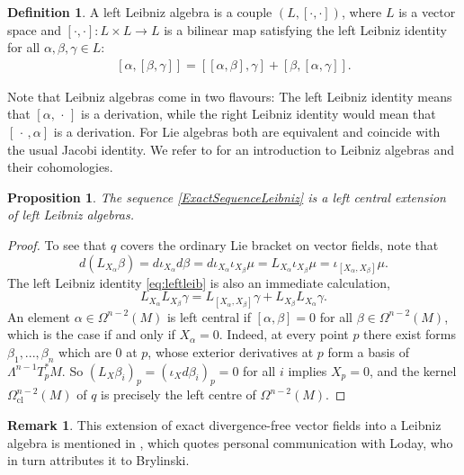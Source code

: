 \documentclass{article}
\newcommand{\cl}{\mathrm{cl}}
\newtheorem{Proposition}[Theorem]{Proposition}
\theoremstyle{definition}
\newtheorem{Definition}[Theorem]{Definition}
\newtheorem{Remark}[Theorem]{Remark}
\begin{document}
\begin{Definition}
    A left Leibniz algebra is a couple $(L,[\cdot,\cdot])$, where $L$ is a vector space and $[\cdot,\cdot]:L\times L\to L$ is a bilinear map satisfying the left Leibniz identity for all $\alpha,\beta,\gamma\in L$:
    \begin{align}\label{eq:leftleib}
        [\alpha, [\beta,\gamma]] = [[\alpha,\beta],\gamma] + 
[\beta, [\alpha,\gamma]].
    \end{align}
\end{Definition} 

Note that Leibniz algebras come in two flavours: The left Leibniz identity means that $[\alpha,\,\cdot\,]$ is a derivation, while the right Leibniz identity would mean that $[\,\cdot\,,\alpha]$ is a derivation. For Lie algebras both are equivalent and coincide with the usual Jacobi identity. We refer to \cite{FeldvossWagemann21} for an introduction to Leibniz algebras and their cohomologies.


\begin{Proposition}
The sequence \eqref{ExactSequenceLeibniz}
is a left central extension of left Leibniz algebras.
\end{Proposition}
\begin{proof}
To see that $q$ covers the ordinary Lie bracket on vector fields, note that \[d(L_{X_\alpha}\beta) = d\iota_{X_{\alpha}}d\beta = d\iota_{X_{\alpha}}\iota_{X_{\beta}}\mu = L_{X_{\alpha}}\iota_{X_{\beta}}\mu = \iota_{[X_{\alpha},X_{\beta}]}\mu.\]
The left Leibniz identity \eqref{eq:leftleib} is also an immediate calculation,
\[
L_{X_{\alpha}}L_{X_{\beta}}\gamma = L_{[X_{\alpha},X_{\beta}]}\gamma + L_{X_{\beta}}L_{X_{\alpha}}\gamma.
\]
An element $\alpha \in \Omega^{n-2}(M)$
is left central if $[\alpha, \beta] = 0$ for 
all $\beta \in \Omega^{n-2}(M)$, which is the case if and only if $X_{\alpha} = 0$. Indeed, at every point $p$ there exist forms $\beta_1,...,\beta_n$ which are 0 at $p$, whose exterior derivatives at $p$ form a basis of $\Lambda^{n-1}T^*_pM$. So $(L_X\beta_{i})_p=(\iota_Xd\beta_{i})_p=0$ for all $i$ implies $X_p=0$, and 
the kernel $\Omega^{n-2}_{\cl}(M)$ of $q$ is precisely the left centre of $\Omega^{n-2}(M)$.
\end{proof}


\begin{Remark} This extension of exact divergence-free vector fields into a Leibniz algebra is mentioned in 
\cite{Roger1995}, which quotes personal communication with Loday, who in turn attributes it to Brylinski.
\end{Remark}
\end{document}
